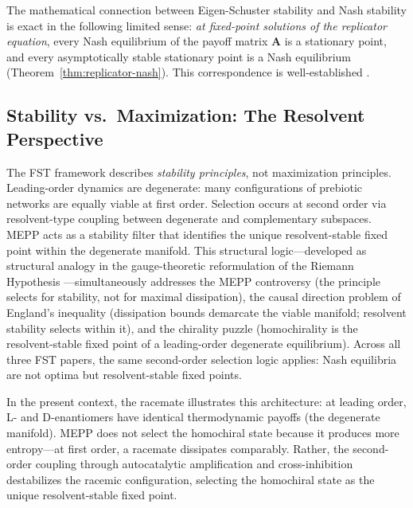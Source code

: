 \documentclass[12pt,a4paper]{article}
\theoremstyle{remark}
\begin{document}
The mathematical connection between Eigen-Schuster stability and Nash stability is exact in the following limited sense: \emph{at fixed-point solutions of the replicator equation}, every Nash equilibrium of the payoff matrix $\mathbf{A}$ is a stationary point, and every asymptotically stable stationary point is a Nash equilibrium (Theorem~\ref{thm:replicator-nash}). This correspondence is well-established \citep{HofbauerSigmund2003}.

\subsection{Stability vs.\ Maximization: The Resolvent Perspective}

The FST framework describes \emph{stability principles}, not maximization principles. Leading-order dynamics are degenerate: many configurations of prebiotic networks are equally viable at first order. Selection occurs at second order via resolvent-type coupling between degenerate and complementary subspaces. MEPP acts as a stability filter that identifies the unique resolvent-stable fixed point within the degenerate manifold. This structural logic---developed as structural analogy in the gauge-theoretic reformulation of the Riemann Hypothesis \citep{GeigerRH2026b}---simultaneously addresses the MEPP controversy (the principle selects for stability, not for maximal dissipation), the causal direction problem of England's inequality (dissipation bounds demarcate the viable manifold; resolvent stability selects within it), and the chirality puzzle (homochirality is the resolvent-stable fixed point of a leading-order degenerate equilibrium). Across all three FST papers, the same second-order selection logic applies: Nash equilibria are not optima but resolvent-stable fixed points.

In the present context, the racemate illustrates this architecture: at leading order, L- and D-enantiomers have identical thermodynamic payoffs (the degenerate manifold). MEPP does not select the homochiral state because it produces more entropy---at first order, a racemate dissipates comparably. Rather, the second-order coupling through autocatalytic amplification and cross-inhibition destabilizes the racemic configuration, selecting the homochiral state as the unique resolvent-stable fixed point.
\end{document}
